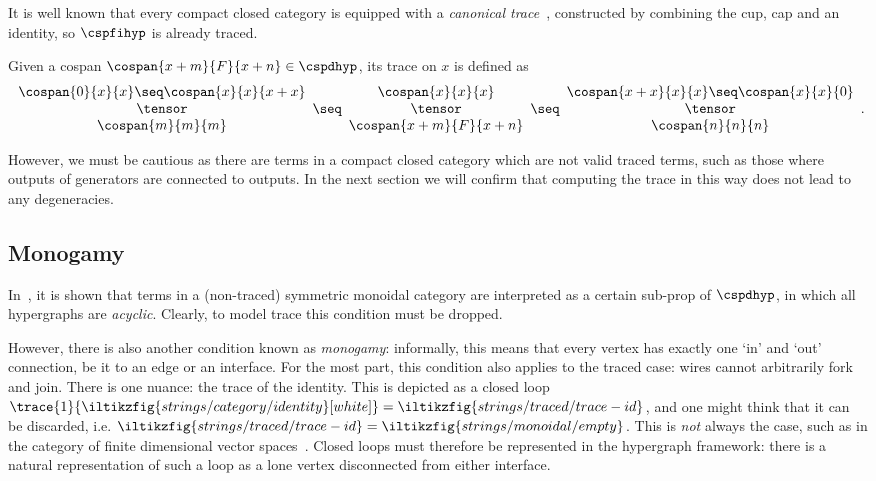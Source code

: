 It is well known that every compact closed category is equipped with a
\emph{canonical trace}~\cite{joyal1996traced}, constructed by combining the cup,
cap and an identity, so \(\cspfihyp\) is already traced.

\begin{definition}
    Given a cospan \(\cospan{x+m}{F}{x+n} \in \cspdhyp\), its trace on \(x\) is
    defined as \[
        \begin{array}{cc}
            \cospan{0}{x}{x} \seq \cospan{x}{x}{x+x} \\
            \tensor \\
            \cospan{m}{m}{m}
        \end{array}
        \seq
        \begin{array}{cc}
            \cospan{x}{x}{x} \\
            \tensor \\
            \cospan{x+m}{F}{x+n}
        \end{array}
        \seq
        \begin{array}{cc}
            \cospan{x+x}{x}{x} \seq \cospan{x}{x}{0} \\
            \tensor \\
            \cospan{n}{n}{n}
        \end{array}.
    \]
\end{definition}

However, we must be cautious as there are terms in a compact closed category
which are not valid traced terms, such as those where outputs of generators are
connected to outputs.
In the next section we will confirm that computing the trace in this way does
not lead to any degeneracies.

\subsection{Monogamy}

In~\cite{bonchi2016rewriting}, it is shown that terms in a (non-traced)
symmetric monoidal category are interpreted as a certain sub-prop of
\(\cspdhyp\), in which all hypergraphs are \emph{acyclic}.
Clearly, to model trace this condition must be dropped.

However, there is also another condition known as \emph{monogamy}: informally,
this means that every vertex has exactly one `in' and `out' connection, be it to
an edge or an interface.
For the most part, this condition also applies to the traced case: wires cannot
arbitrarily fork and join.
There is one nuance: the trace of the identity.
This is depicted as a closed loop \(
    \trace{1}{\iltikzfig{strings/category/identity}[white]}
    =
    \iltikzfig{strings/traced/trace-id}
\), and one might think that it can be discarded, i.e. \(
    \iltikzfig{strings/traced/trace-id}
    =
    \iltikzfig{strings/monoidal/empty}
\).
This is \emph{not} always the case, such as in the category of finite
dimensional vector spaces~\cite[Sec. 6.1]{hasegawa1997recursion}.
Closed loops must therefore be represented in the hypergraph framework:
there is a natural representation of such a loop as a lone vertex disconnected
from either interface.

